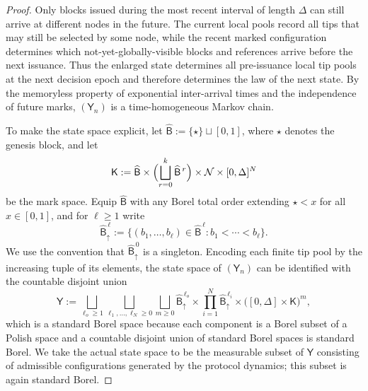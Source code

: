 \documentclass[10pt,a4paper]{amsart}
\newcommand{\Nodes}{{\mathcal N}}
\begin{document}
\begin{proof}
Only blocks issued during the most recent interval of length $\Delta$ can still arrive at different nodes in the future. The current local pools record all tips that may still be selected by some node, while the recent marked configuration determines which not-yet-globally-visible blocks and references arrive before the next issuance. Thus the enlarged state determines all pre-issuance local tip pools at the next decision epoch and therefore determines the law of the next state. By the memoryless property of exponential inter-arrival times and the independence of future marks, $(\mathsf{Y}_n)$ is a time-homogeneous Markov chain.

To make the state space explicit, let $\widehat{\mathsf B}:=\{\star\}\sqcup [0,1]$, where $\star$ denotes the genesis block, and let
\[
   \mathsf K
   :=
   \widehat{\mathsf B}\times
   \Bigl(\bigsqcup_{r=0}^k \widehat{\mathsf B}^{\,r}\Bigr)\times
   \Nodes\times [0,\Delta]^N
\]
be the mark space. Equip $\widehat{\mathsf B}$ with any Borel total order extending $\star<x$ for all $x\in[0,1]$, and for $\ell\ge 1$ write
\[
   \widehat{\mathsf B}^{\,\ell}_{\uparrow}
   :=
   \{(b_1,\ldots,b_\ell)\in \widehat{\mathsf B}^{\,\ell}: b_1<\cdots < b_\ell\}.
\]
We use the convention that $\widehat{\mathsf B}^{\,0}_{\uparrow}$ is a singleton.
Encoding each finite tip pool by the increasing tuple of its elements, the state space of $(\mathsf{Y}_n)$ can be identified with the countable disjoint union
\[
   \mathsf Y
   :=
   \bigsqcup_{\ell_o\ge 1}
   \bigsqcup_{\ell_1,\ldots,\ell_N\ge 0}
   \bigsqcup_{m\ge 0}
   \widehat{\mathsf B}^{\,\ell_o}_{\uparrow}
   \times
   \prod_{i=1}^N \widehat{\mathsf B}^{\,\ell_i}_{\uparrow}
   \times \bigl([0,\Delta]\times \mathsf K\bigr)^m,
\]
which is a standard Borel space because each component is a Borel subset of a Polish space and a countable disjoint union of standard Borel spaces is standard Borel.
We take the actual state space to be the measurable subset of $\mathsf Y$ consisting of admissible configurations generated by the protocol dynamics; this subset is again standard Borel.


\end{proof}
\end{document}
